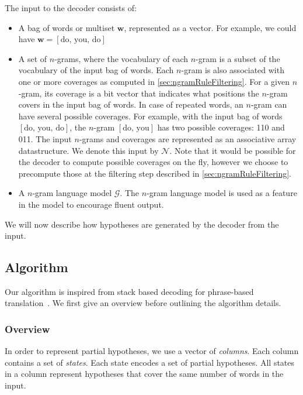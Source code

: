 The input to the decoder consists of:
%
\begin{itemize}
  \item A bag of words or multiset $\bm{w}$, represented as a vector.
    For example, we could have $\bm{w} = [\text{do, you, do}]$
  \item A set of $n$-grams, where the
    vocabulary of each $n$-gram is a subset of the vocabulary of the
    input bag of words. Each $n$-gram is also associated with
    one or more coverages as computed in \autoref{sec:ngramRuleFiltering}.
    For a given $n$-gram, its coverage is a bit vector
    that indicates what positions the $n$-gram covers in the input bag of words.
    In case of repeated words, an $n$-gram can have several possible
    coverages. For example, with the input bag of words
    $[\text{do, you, do}]$, the $n$-gram $[\text{do, you}]$ has
    two possible coverages: 110 and 011.
    The input $n$-grams and coverages are represented as
    an associative array datastructure. We denote this
    input by $\mathcal{N}$. Note that it would be possible for the decoder
    to compute possible coverages on the fly, however we choose to precompute those
    at the filtering step described in \autoref{sec:ngramRuleFiltering}.
  \item A $n$-gram language model $\mathcal{G}$. The $n$-gram
    language model is used as a feature in the model to
    encourage fluent output.
\end{itemize}
%
We will now describe how hypotheses are generated by the decoder
from the input.

\subsection{Algorithm}

Our algorithm is inspired from stack based decoding for phrase-based
translation~\citep{koehn:2010:book}. We first give an overview
before outlining the algorithm details.

\subsubsection{Overview}
\label{sec:gyroAlgorithmOverview}

In order to represent partial hypotheses, we use a vector
of \emph{columns}. Each column contains a set of
\emph{states}. Each state encodes a set of partial hypotheses.
All states in a column represent hypotheses that cover
the same number of words in the input.

